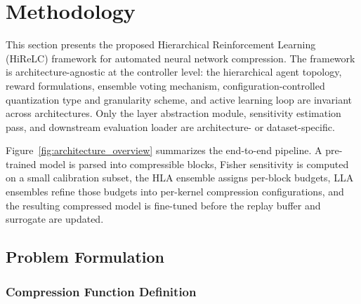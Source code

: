 \documentclass[preprint,12pt,authoryear]{elsarticle}
\begin{document}

\section{Methodology}

This section presents the proposed Hierarchical Reinforcement Learning (HiReLC)
framework for automated neural network compression. The framework is
architecture-agnostic at the controller level: the hierarchical agent topology, reward
formulations, ensemble voting mechanism, configuration-controlled quantization type and
granularity scheme, and active learning loop are invariant across architectures. Only
the layer abstraction module, sensitivity estimation pass, and downstream evaluation
loader are architecture- or dataset-specific.

Figure~\ref{fig:architecture_overview} summarizes the end-to-end pipeline. A
pre-trained model is parsed into compressible blocks, Fisher sensitivity is computed on a
small calibration subset, the HLA ensemble assigns per-block budgets, LLA ensembles refine
those budgets into per-kernel compression configurations, and the resulting compressed
model is fine-tuned before the replay buffer and surrogate are updated.


\subsection{Problem Formulation}

\subsubsection{Compression Function Definition}
\label{sec:compression_function}
\end{document}
